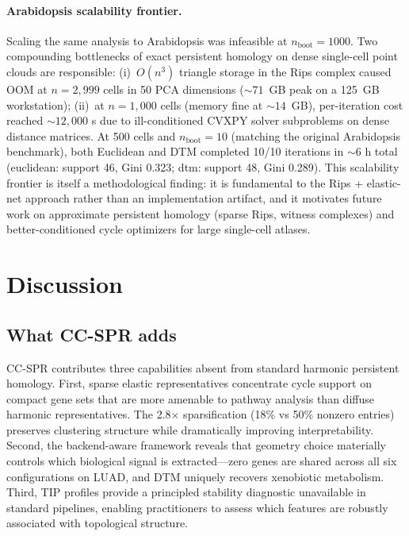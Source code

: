 \documentclass[12pt]{article}
\begin{document}
\paragraph{Arabidopsis scalability frontier.}
Scaling the same analysis to Arabidopsis was infeasible at $n_{\text{boot}} = 1000$.
Two compounding bottlenecks of exact persistent homology on dense single-cell point clouds are responsible:
(i)~$O(n^3)$ triangle storage in the Rips complex caused OOM at $n = 2{,}999$ cells in 50 PCA dimensions ($\sim 71$~GB peak on a 125~GB workstation);
(ii)~at $n = 1{,}000$ cells (memory fine at $\sim 14$~GB), per-iteration cost reached $\sim 12{,}000$ s due to ill-conditioned CVXPY solver subproblems on dense distance matrices.
At 500 cells and $n_{\text{boot}} = 10$ (matching the original Arabidopsis benchmark), both Euclidean and DTM completed 10/10 iterations in $\sim 6$ h total (euclidean: support 46, Gini 0.323; dtm: support 48, Gini 0.289).
This scalability frontier is itself a methodological finding: it is fundamental to the Rips + elastic-net approach rather than an implementation artifact, and it motivates future work on approximate persistent homology (sparse Rips, witness complexes) and better-conditioned cycle optimizers for large single-cell atlases.


\section{Discussion}
\label{sec:discussion}

\subsection{What CC-SPR adds}

CC-SPR contributes three capabilities absent from standard harmonic persistent homology.
First, sparse elastic representatives concentrate cycle support on compact gene sets that are more amenable to pathway analysis than diffuse harmonic representatives.
The 2.8$\times$ sparsification (18\% vs 50\% nonzero entries) preserves clustering structure while dramatically improving interpretability.
Second, the backend-aware framework reveals that geometry choice materially controls which biological signal is extracted---zero genes are shared across all six configurations on LUAD, and DTM uniquely recovers xenobiotic metabolism.
Third, TIP profiles provide a principled stability diagnostic unavailable in standard pipelines, enabling practitioners to assess which features are robustly associated with topological structure.
\end{document}
